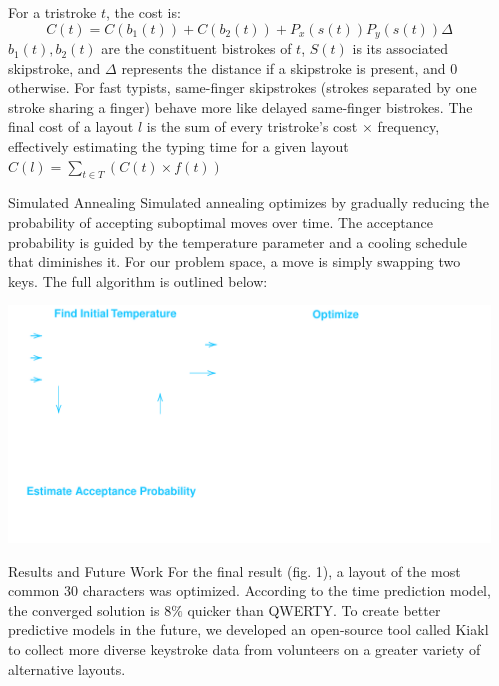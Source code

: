 \documentclass[final,20pt]{beamer}
\newlength{\sepwidth}
\newlength{\colwidth}
\newcommand{\separatorcolumn}{\begin{column}{\sepwidth}\end{column}}
\begin{document}
\begin{frame}[t]
\begin{columns}[t]
\begin{column}{\colwidth}
    For a tristroke $t$, the cost is: 
    \begin{equation*}
    C(t) = C(b_1(t)) + C(b_2(t)) + P_x(s(t))  P_y(s(t)) \Delta
    \end{equation*}
    $b_1(t), b_2(t)$ are the constituent bistrokes of $t$, $S(t)$ is its associated skipstroke, and $\Delta$ represents the distance if a skipstroke is present, and $0$ otherwise. For fast typists, same-finger skipstrokes (strokes separated by one stroke sharing a finger) behave more like delayed same-finger bistrokes. The final cost of a layout $l$ is the sum of every tristroke's cost $\times$ frequency, effectively estimating the typing time for a given layout $C(l) = \sum_{t \in T} (C(t) \times f(t) )$
    \justifying

        
  \begin{block}{Simulated Annealing}
    Simulated annealing optimizes by gradually reducing the probability of accepting suboptimal moves over time. The acceptance probability is guided by the temperature parameter and a cooling schedule that diminishes it. For our problem space, a move is simply swapping two keys. The full algorithm is outlined below:

    \includegraphics[width=\textwidth]{sa.pdf}

  \end{block}

  \begin{alertblock}{Results and Future Work}
    For the final result (fig. 1), a layout of the most common $30$ characters was optimized. According to the time prediction model, the converged solution is $8\%$ quicker than QWERTY. To create better predictive models in the future, we developed an open-source tool called Kiakl to collect more diverse keystroke data from volunteers on a greater variety of alternative layouts.
  \end{alertblock}


\end{column}

\separatorcolumn
\end{columns}
\end{frame}
\end{document}
